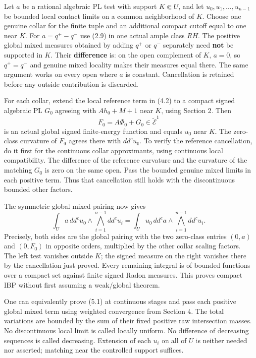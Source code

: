 \documentclass[
  10pt,
]{article}
\begin{document}
Let \(a\) be a rational algebraic PL test with support \(K\Subset U\),
and let \(u_0,u_1,\ldots,u_{n-1}\) be bounded local contact limits on a
common neighborhood of \(K\). Choose one genuine collar for the finite
tuple and an additional compact cutoff equal to one near \(K\). For
\(a=q^+-q^-\) use (2.9) in one actual ample class \(RH\). The positive
global mixed measures obtained by adding \(q^+\) or \(q^-\) separately
need \textbf{not} be supported in \(K\). Their \textbf{difference} is:
on the open complement of \(K\), \(a=0\), so \(q^+=q^-\) and genuine
mixed locality makes their measures equal there. The same argument works
on every open where \(a\) is constant. Cancellation is retained before
any outside contribution is discarded.

For each collar, extend the local reference term in (4.2) to a compact
signed algebraic PL \(G_0\) agreeing with \(Ah_0+M+1\) near \(K\), using
Section 2. Then \[F_0=A\Phi_0+G_0\in\widetilde{\mathcal E}^{1}\] is an
actual global signed finite-energy function and equals \(u_0\) near
\(K\). The zero-class curvature of \(F_0\) agrees there with
\(dd^cu_0\). To verify the reference cancellation, do it first for the
continuous collar approximants, using continuous local compatibility.
The difference of the reference curvature and the curvature of the
matching \(G_0\) is zero on the same open. Pass the bounded genuine
mixed limits in each positive term. Thus that cancellation still holds
with the discontinuous bounded other factors.

The symmetric global mixed pairing now gives
\[\int_U a\,dd^cu_0\wedge\bigwedge_{i=1}^{n-1}dd^cu_i
=\int_U u_0\,dd^ca\wedge\bigwedge_{i=1}^{n-1}dd^cu_i. \tag{5.1}\]
Precisely, both sides are the global pairing with the two zero-class
entries \((0,a)\) and \((0,F_0)\) in opposite orders, multiplied by the
other collar scaling factors. The left test vanishes outside \(K\); the
signed measure on the right vanishes there by the cancellation just
proved. Every remaining integral is of bounded functions over a compact
set against finite signed Radon measures. This proves compact IBP
without first assuming a weak/global theorem.

One can equivalently prove (5.1) at continuous stages and pass each
positive global mixed term using weighted convergence from Section 4.
The total variations are bounded by the sum of their fixed positive raw
intersection masses. No discontinuous local limit is called locally
uniform. No difference of decreasing sequences is called decreasing.
Extension of each \(u_i\) on all of \(U\) is neither needed nor
asserted; matching near the controlled support suffices.
\end{document}
